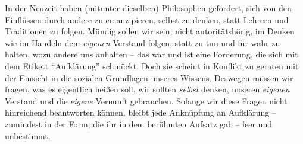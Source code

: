 In der Neuzeit haben (mitunter dieselben) Philosophen gefordert, sich von
den Einflüssen durch andere zu emanzipieren, selbst zu denken, statt Lehrern und
Traditionen zu folgen. Mündig sollen wir sein, nicht autoritätshörig, im Denken
wie im Handeln dem \emph{eigenen} Verstand folgen, statt zu tun und für wahr zu
halten, wozu andere uns anhalten -- das war und ist eine Forderung, die sich mit
dem Etikett \enquote{Aufklärung} schmückt. Doch sie scheint in
Konflikt zu geraten mit der Einsicht in die sozialen Grundlagen unseres
Wissens. Deswegen müssen wir fragen, was es eigentlich
heißen soll, wir sollten \emph{selbst} denken, unseren \emph{eigenen} Verstand
und die \emph{eigene} Vernunft gebrauchen. Solange wir diese Fragen nicht
hinreichend beantworten können, bleibt jede Anknüpfung an 
Aufklärung -- zumindest in der Form, die  ihr in dem
berühmten Aufsatz gab -- leer und unbestimmt.

